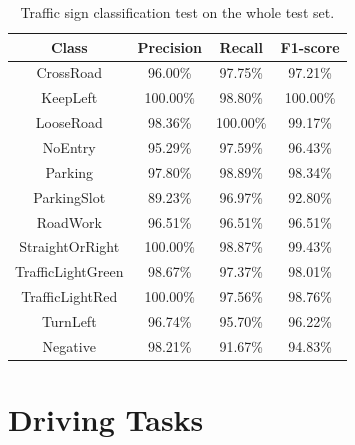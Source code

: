 \begin{table}[h]
  \begin{center}
    \caption{Traffic sign classification test on the whole test set.}
    \label{table:classification-metrics2}
    \begin{tabular}{|c|c|c|c|}
      \hline
      \textbf{Class}    & \textbf{Precision} & \textbf{Recall}  & \textbf{F1-score} \\
      \hline
      CrossRoad         & 96.00\%            & 97.75\%          & 97.21\% \\ 
      \hline
      KeepLeft          & 100.00\%           & 98.80\%          & 100.00\% \\ 
      \hline
      LooseRoad         & 98.36\%            & 100.00\%         & 99.17\% \\ 
      \hline
      NoEntry           & 95.29\%            & 97.59\%          & 96.43\% \\
      \hline
      Parking           & 97.80\%            & 98.89\%          & 98.34\% \\ 
      \hline
      ParkingSlot       & 89.23\%            & 96.97\%          & 92.80\%  \\ 
      \hline
      RoadWork          & 96.51\%            & 96.51\%          & 96.51\% \\ 
      \hline
      StraightOrRight   & 100.00\%           & 98.87\%          & 99.43\%  \\ 
      \hline
      TrafficLightGreen & 98.67\%            & 97.37\%          & 98.01\%  \\ 
      \hline
      TrafficLightRed   & 100.00\%           & 97.56\%          & 98.76\%  \\ 
      \hline
      TurnLeft          & 96.74\%            & 95.70\%          & 96.22\%  \\
      \hline
      Negative          & 98.21\%            & 91.67\%          & 94.83\%  \\
      \hline
    \end{tabular}
  \end{center}
\end{table}

\section{Driving Tasks}

